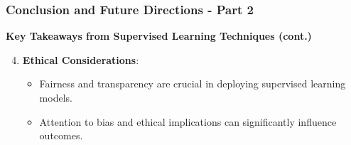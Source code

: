 \documentclass[aspectratio=169]{beamer}
\begin{document}
\begin{frame}[fragile]
    \frametitle{Conclusion and Future Directions - Part 2}
    
    \textbf{Key Takeaways from Supervised Learning Techniques (cont.)}

    \begin{enumerate}
        \setcounter{enumi}{3} %
        \item \textbf{Ethical Considerations}:
        \begin{itemize}
            \item Fairness and transparency are crucial in deploying supervised learning models.
            \item Attention to bias and ethical implications can significantly influence outcomes.
        \end{itemize}
    \end{enumerate}
\end{frame}
\end{document}
